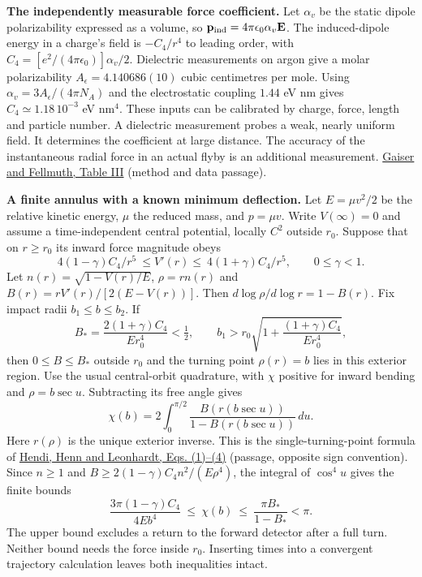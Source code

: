 \documentclass[11pt,a4paper]{article}
\begin{document}
\textbf{The independently measurable force coefficient.} Let
\(\alpha_v\) be the static dipole polarizability expressed as a volume,
so \(\mathbf p_{\rm ind}=4\pi\epsilon_0\alpha_v\mathbf E\). The
induced-dipole energy in a charge's field is \(-C_4/r^4\) to leading
order, with \(C_4=[e^2/(4\pi\epsilon_0)]\alpha_v/2\). Dielectric
measurements on argon give a molar polarizability
\(A_\epsilon=4.140686(10)\) cubic centimetres per mole. Using
\(\alpha_v=3A_\epsilon/(4\pi N_A)\) and the electrostatic coupling
\(1.44\) eV nm gives \(C_4\simeq1.18\,10^{-3}\) eV nm\(^4\). These
inputs can be calibrated by charge, force, length and particle number. A
dielectric measurement probes a weak, nearly uniform field. It
determines the coefficient at large distance. The accuracy of the
instantaneous radial force in an actual flyby is an additional
measurement.
\href{https://doi.org/10.1103/PhysRevLett.120.123203}{Gaiser and
Fellmuth, Table III} (method and data passage).

\textbf{A finite annulus with a known minimum deflection.} Let
\(E=\mu v^2/2\) be the relative kinetic energy, \(\mu\) the reduced
mass, and \(p=\mu v\). Write \(V(\infty)=0\) and assume a
time-independent central potential, locally \(C^2\) outside \(r_0\).
Suppose that on \(r\ge r_0\) its inward force magnitude obeys \[
 4(1-\gamma)C_4/r^5\ \le V'(r)\le\ 4(1+\gamma)C_4/r^5,
 \qquad 0\le\gamma<1 .
\] Let \(n(r)=\sqrt{1-V(r)/E}\), \(\rho=r n(r)\) and
\(B(r)=rV'(r)/[2(E-V(r))]\). Then \(d\log\rho/d\log r=1-B(r)\). Fix
impact radii \(b_1\le b\le b_2\). If \[
 B_*=\frac{2(1+\gamma)C_4}{E r_0^4}<\tfrac12,\qquad
 b_1>r_0\sqrt{1+\frac{(1+\gamma)C_4}{E r_0^4}},
\] then \(0\le B\le B_*\) outside \(r_0\) and the turning point
\(\rho(r)=b\) lies in this exterior region. Use the usual central-orbit
quadrature, with \(\chi\) positive for inward bending and
\(\rho=b\sec u\). Subtracting its free angle gives \[
 \chi(b)=2\int_0^{\pi/2}\frac{B(r(b\sec u))}{1-B(r(b\sec u))}\,du .
\] Here \(r(\rho)\) is the unique exterior inverse. This is the
single-turning-point formula of
\href{https://arxiv.org/pdf/cond-mat/0605637}{Hendi, Henn and Leonhardt,
Eqs. (1)--(4)} (passage, opposite sign convention). Since \(n\ge1\) and
\(B\ge 2(1-\gamma)C_4 n^2/(E\rho^4)\), the integral of \(\cos^4u\) gives
the finite bounds \[
 \frac{3\pi(1-\gamma)C_4}{4E b^4}
 \ \le\ \chi(b)\ \le\ \frac{\pi B_*}{1-B_*}<\pi .
\] The upper bound excludes a return to the forward detector after a
full turn. Neither bound needs the force inside \(r_0\). Inserting times
into a convergent trajectory calculation leaves both inequalities
intact.
\end{document}
